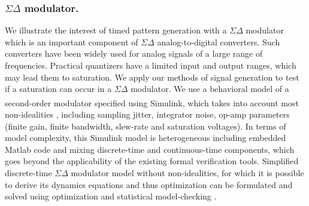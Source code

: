 \subsubsection*{$\Sigma \Delta$ modulator.}
 We illustrate the interest of timed pattern generation with a $\Sigma \Delta$ modulator which is an important component of $\Sigma \Delta$ analog-to-digital converters. Such converters have been widely used for analog signals of a large range of frequencies. Practical quantizers have a limited input and output ranges, which may lead them to saturation. We apply our methods of signal generation to test if a saturation can occur in a $\Sigma \Delta$ modulator. We use a behavioral model of a second-order modulator specified using Simulink\textsuperscript{\textregistered}, which takes into account most non-idealities \cite{Brigati99}, including sampling jitter, integrator noise, op-amp parameters (finite gain, finite bandwidth, slew-rate and saturation voltages). In terms of model complexity, this Simulink model is heterogeneous including embedded Matlab code and mixing discrete-time and continuous-time components, which goes beyond the applicability of the existing formal verification tools. Simplified discrete-time $\Sigma \Delta$ modulator model without non-idealities, for which it is possible to derive its dynamics equations and thus optimization can be formulated and solved using optimization \cite{DangDM04} and statistical model-checking \cite{ClarkeDL10}.
